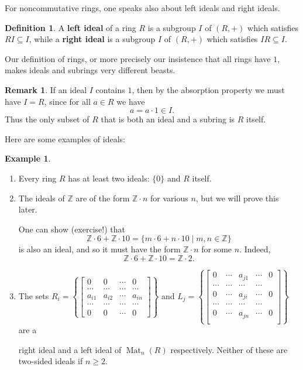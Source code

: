 \documentclass[12pt]{report}
\numberwithin{equation}{section}
\numberwithin{theorem}{chapter}
\theoremstyle{definition}
\newtheorem{definition}[theorem]{Definition}
\newtheorem{example}[theorem]{Example}
\newtheorem*{basic properties}{Basic Properties}
\newtheorem*{Important Remark}{Important Remark}
\newtheorem{remark}[theorem]{Remark}
\newcommand{\df}[1]{{\bf #1}\index{#1}}
\DeclareMathOperator{\Mat}{Mat}
\begin{document}
For noncommutative rings, one speaks also about left ideals and right ideals. 

\begin{definition}
A \df{left ideal} of a ring $R$ is a subgroup $I$ of $(R,+)$ which satisfies $RI \subseteq I$, while a \df{right ideal} is a subgroup $I$ of $(R,+)$ which satisfies $IR \subseteq I$. 
\end{definition}

Our definition of rings, or more precisely our insistence that all rings have $1$, makes ideals and subrings very different beasts.

\begin{remark} 
If an ideal $I$ contains $1$, then by the absorption property we must have $I = R$, since for all $a \in R$ we have
$$a = a \cdot 1 \in I.$$
Thus the only subset of $R$ that is both an ideal and a subring is $R$ itself.
\end{remark}


Here are some examples of ideals:

\begin{example}
\begin{enumerate}
\item Every ring $R$ has at least two ideals: $\{0\}$ and $R$ itself. 

\item The ideals of $\mathbb{Z}$ are of the form $\mathbb{Z} \cdot n$ for various $n$, but we will prove this later. %

One can show (exercise!) that 
$$\mathbb{Z} \cdot 6 + \mathbb{Z} \cdot 10 = \{m \cdot 6 + n \cdot 10 \mid m,n \in \mathbb{Z}\}$$ 
is also an ideal, and so it must have the form $\mathbb{Z} \cdot n$ for some $n$. Indeed, 
$$\mathbb{Z} \cdot 6 + \mathbb{Z} \cdot 10 = \mathbb{Z} \cdot 2.$$

\item The sets $R_i=\left\{\begin{bmatrix} 0 & 0 & \cdots & 0\\ \cdots & \cdots & \cdots & \cdots \\ a_{i1} & a_{i2} & \cdots &a_{in} \\  \cdots & \cdots & \cdots & \cdots \\  0 &
      0 & \cdots &0\end{bmatrix}\right\}$ and $L_j=\left\{\begin{bmatrix} 0 & \cdots & a_{j1} &\cdots & 0\\ \cdots & \cdots & \cdots & \cdots \\0 & \cdots & a_{ji} &\cdots & 0\\
      \cdots & \cdots & \cdots & \cdots \\ 0 & \cdots & a_{jn} &\cdots & 0\\\end{bmatrix}\right\}$ are a 

\noindent      
right ideal and a left ideal of $\Mat_n(R)$ respectively. Neither of these are two-sided ideals if $n \geqslant 2$.	
\end{enumerate}
\end{example}
\end{document}
